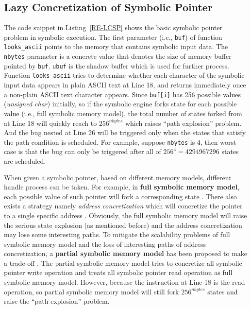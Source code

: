 \subsection{Lazy Concretization of Symbolic Pointer}
The code snippet in Listing~\ref{RE-LCSP} shows the basic symbolic pointer problem in symbolic execution. 
The first parameter (i.e., \texttt{buf}) of function \texttt{looks\_ascii} points to the memory that contains symbolic input data. The \texttt{nbytes} parameter is a concrete value that denotes the size of memory buffer pointed by \texttt{buf}. \texttt{ubuf} is the shadow buffer which is used for further process. 
Function \texttt{looks\_ascii} tries to determine whether each character of the symbolic input data appears in plain ASCII text at Line 18, and returns immediately once a non-plain ASCII text character appears. 
Since \texttt{buf[i]} has 256 possible values (\textit{unsigned char}) initially, so if the symbolic engine forks state for each possible value (i.e., full symbolic memory model), the total number of states forked from at Line 18 will quickly reach to $256^{nbytes}$ which raises ``path explosion'' problem. And the bug nested at Line 26 will be triggered only when the states that satisfy the path condition is scheduled. For example, suppose \texttt{nbytes} is 4, then worst case is that the bug can only be triggered after all of $256^4=4294967296$ states are scheduled.

When given a symbolic pointer, based on different memory models, different handle process can be taken. For example, in \textbf{full symbolic memory model}, each possible value of such pointer will fork a corresponding state \cite{song2008bitblaze, thakur2010directed, brumley2011bap, trtik2014symbolic}. There also exists a strategy namely \textit{address concretization} which will concretize the pointer to a single specific address \cite{godefroid2005dart, burnim2008heuristics}. Obviously, the full symbolic memory model will raise the serious state explosion (as mentioned before) and the address concretization may lose some interesting paths. To mitigate the scalability problems of full symbolic memory model and the loss of interesting paths of address concretization, a \textbf{partial symbolic memory model} has been proposed to make a trade-off \cite{cha2012unleashing, avgerinos2014exploiting, Shoshitaishvili_firmalice-automatic}. The partial symbolic memory model tries to concretize all symbolic pointer write operation and treats all symbolic pointer read operation as full symbolic memory model. However, because the instruction at Line 18 is the read operation, so partial symbolic memory model will still fork $256^{nbytes}$ states and raise the ``path explosion'' problem.

